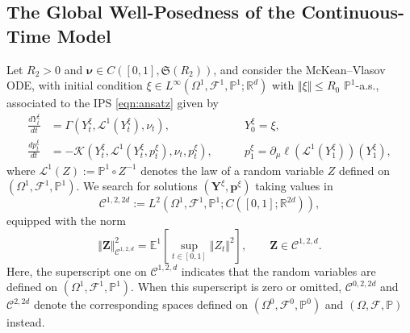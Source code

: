 \documentclass{article}
\newcommand{\R}{\mathbb{R}}
\begin{document}
\begin{appendices}
\section{The Global Well-Posedness of the Continuous-Time Model}\label{App:E}
Let $R_2>0$ and $\bm\nu\in C([0,1],\mathfrak{S}(R_2))$, and consider the McKean--Vlasov ODE, with initial condition $\xi\in L^\infty(\Omega^1,\mathcal F^1,\mathbb P^1; \R^d)$ with $\Vert \xi\Vert \le R_0$ $\mathbb P^1$-a.s., associated to the IPS \eqref{eqn:ansatz} given by
\begin{align}
    \frac{dY^{\xi}_t}{dt} &= \Gamma(Y^\xi_t,\mathcal L^1(Y^\xi_t),\nu_t), \qquad &Y^\xi_0 =\xi,\label{eqn:MVODE1}\\
    \frac{d p^{\xi}_t}{dt} &= - \mathcal K(Y^\xi_t,\mathcal L^1(Y^\xi_t,p^\xi_t),\nu_t,p^\xi_t), \qquad &p^\xi_1 = \partial_\mu\ell(\mathcal L^1(Y^\xi_1))(Y^\xi_1),\label{eqn:MVODE2}
\end{align}
where $\mathcal L^1(Z):=\mathbb P^1\circ Z^{-1}$ denotes the law of a random variable $Z$ defined on $(\Omega^1,\mathcal F^1,\mathbb P^1)$. We search for solutions $(\bm{Y}^\xi,\bm{p}^\xi)$ taking values in $$\mathscr{C}^{1,2,2d}:=L^2(\Omega^1,\mathcal F^1,\mathbb P^1; C([0,1]; \R^{2d})),$$
equipped with the norm
\[
\Vert \bm{Z}\Vert^2_{\mathscr{C}^{1,2,d}}=\mathbb E^1\left[ \sup_{t\in[0,1]} \Vert Z_t\Vert^2 \right], \qquad \bm{Z}\in\mathscr{C}^{1,2,d} .
\]
Here, the superscript one on $\mathscr{C}^{1,2,d}$ indicates that the random variables are defined on $(\Omega^1, \mathcal F^1,\mathbb P^1)$. When this superscript is zero or omitted, $\mathscr{C}^{0,2,2d}$ and $\mathscr{C}^{2,2d}$ denote the corresponding spaces defined on $(\Omega^0,\mathcal F^0,\mathbb P^0)$ and $(\Omega,\mathcal F,\mathbb P)$ instead.


\end{appendices}
\end{document}
